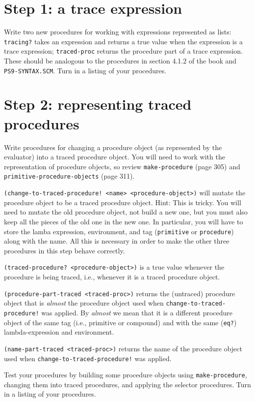 \section{Step 1: a trace expression}

Write two new procedures for working with expressions represented
as lists:  {\tt tracing?} takes an expression and returns a true value 
when the expression is a trace expression; {\tt traced-proc} returns the 
procedure part of a trace expression.  These should be analogous to
the procedures in section 4.1.2 of the book and {\tt PS9-SYNTAX.SCM}.
Turn in a listing of your procedures.

\section{Step 2: representing traced procedures}

Write procedures for changing a procedure object (as represented by
the evaluator) into a traced procedure object.  You will need to
work with the representation of procedure objects, so review
{\tt make-procedure} (page 305) and {\tt primitive-procedure-objects}
(page 311).  

{\tt (change-to-traced-procedure! <name> <procedure-object>)}
will mutate the procedure object to be a traced procedure object.  
Hint: This is tricky. You will need to mutate the old procedure object, 
not build a new one, but you must also keep all the pieces of 
the old one in the new one.  In particular, you will have to store the 
lamba expression, environment, and tag ({\tt primitive} or {\tt procedure})
along with the name.  All this is necessary in order to make the other
three procedures in this step behave correctly.	

{\tt (traced-procedure? <procedure-object>)} is a true value 
whenever the procedure is being traced, i.e., whenever it is a traced 
procedure object.

{\tt (procedure-part-traced <traced-proc>)} returns the (untraced)
procedure object that is {\it almost} the procedure object used when
{\tt change-to-traced-procedure!} was applied.  By {\it almost} we
mean that it is a different procedure object of the same tag
(i.e., primitive or compound) and with the same ({\tt eq?})
lambda-expression and environment.

{\tt (name-part-traced <traced-proc>)} returns the name of the 
procedure object used when {\tt change-to-traced-procedure!} was applied.

Test your procedures by building some procedure objects using 
{\tt make-procedure}, changing them into traced procedures, and
applying the selector procedures.  Turn in a listing of your
procedures.

